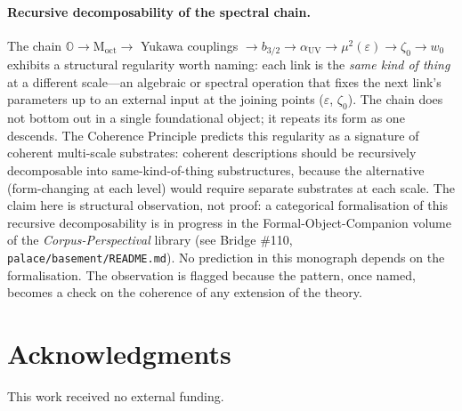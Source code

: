 \paragraph{Recursive decomposability of the spectral chain.}
The chain $\mathbb{O} \to \mathrm{M}_\mathrm{oct} \to $ Yukawa couplings $\to b_{3/2} \to \alpha_\mathrm{UV} \to \mu^2(\varepsilon) \to \zeta_0 \to w_0$ exhibits a structural regularity worth naming: each link is the \emph{same kind of thing} at a different scale---an algebraic or spectral operation that fixes the next link's parameters up to an external input at the joining points ($\varepsilon$, $\zeta_0$). The chain does not bottom out in a single foundational object; it repeats its form as one descends. The Coherence Principle predicts this regularity as a signature of coherent multi-scale substrates: coherent descriptions should be recursively decomposable into same-kind-of-thing substructures, because the alternative (form-changing at each level) would require separate substrates at each scale. The claim here is structural observation, not proof: a categorical formalisation of this recursive decomposability is in progress in the Formal-Object-Companion volume of the \emph{Corpus-Perspectival} library (see Bridge \#110, \texttt{palace/basement/README.md}). No prediction in this monograph depends on the formalisation. The observation is flagged because the pattern, once named, becomes a check on the coherence of any extension of the theory.

\section*{Acknowledgments}

This work received no external funding.

